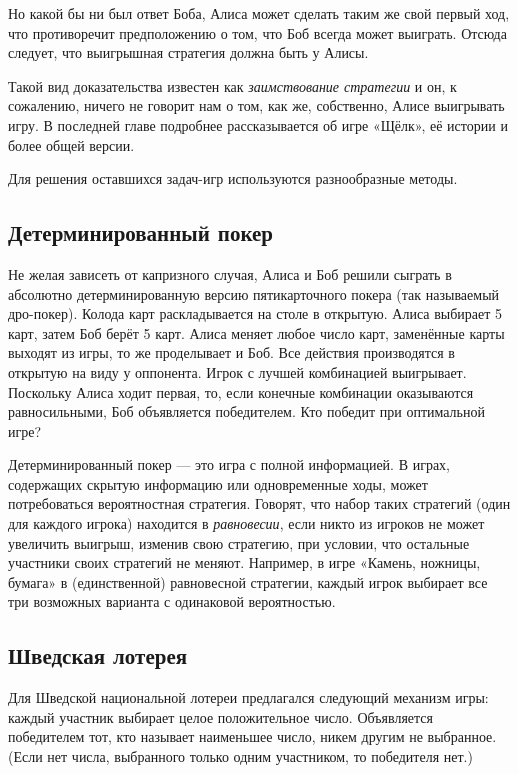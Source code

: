 Но какой бы ни был ответ Боба, Алиса может сделать таким же свой первый ход, что противоречит предположению о том, что Боб всегда может выиграть.
Отсюда следует,
что выигрышная стратегия должна быть у Алисы.
\heart

Такой вид доказательства известен как \emph{заимствование стратегии} и он, к сожалению, ничего не говорит нам о том, как же, собственно, Алисе выигрывать игру.
В последней главе подробнее рассказывается об игре «Щёлк», её истории и более общей версии.

\medskip

Для решения оставшихся задач-игр используются разнообразные методы.

\subsection*{Детерминированный покер}%

Не желая зависеть от капризного случая, Алиса и Боб решили сыграть в абсолютно детерминированную версию пятикарточного покера (так называемый дро-покер).
Колода карт раскладывается на столе в открытую.
Алиса выбирает 5 карт, затем Боб берёт 5 карт.
Алиса меняет любое число карт, заменённые карты выходят из игры, то же проделывает и Боб.
Все действия производятся в открытую на виду у оппонента.
Игрок с лучшей комбинацией выигрывает.
Поскольку Алиса ходит первая, то, если конечные комбинации оказываются равносильными, Боб объявляется победителем.
Кто победит при оптимальной игре?

\medskip

Детерминированный покер --- это игра с полной информацией.
В играх, содержащих скрытую информацию или одновременные ходы, может потребоваться вероятностная стратегия.
Говорят, что набор таких стратегий (один для каждого игрока) находится в \emph{равновесии}, если никто из игроков не может увеличить выигрыш, изменив свою стратегию, при условии, что остальные участники своих стратегий не меняют.
Например, в игре «Камень, ножницы, бумага» в (единственной) равновесной стратегии, каждый игрок выбирает все три возможных варианта с одинаковой вероятностью.

\subsection*{Шведская лотерея}%

Для Шведской национальной лотереи предлагался следующий механизм игры: каждый участник выбирает целое положительное число.
Объявляется победителем тот, кто называет наименьшее число, никем другим не выбранное.
(Если нет числа, выбранного только одним участником, то победителя нет.)

